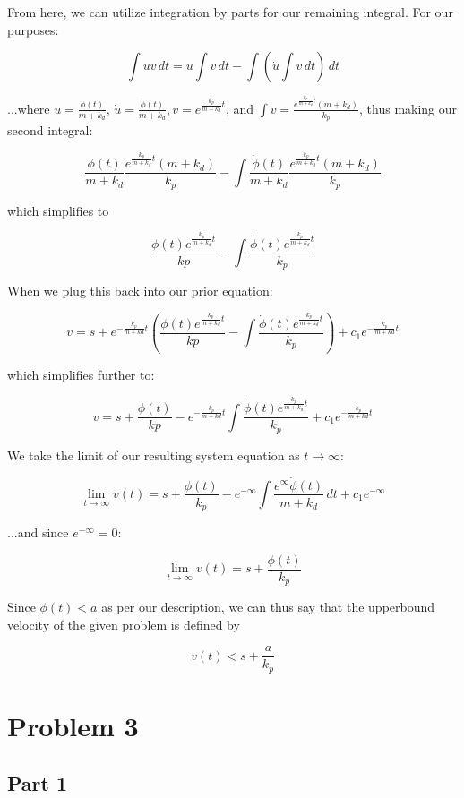 \documentclass{article}
\begin{document}
From here, we can utilize integration by parts for our remaining integral. For our purposes:

\[\int u v \,dt = u \int v \,dt - \int (\dot u \int v \,dt)\,dt\]

...where \(u = \frac{\phi(t)}{m+k_d}\), \(\dot u = \frac{\dot \phi(t)}{m+k_d}, v = e^{\frac{k_p}{m+k_d}t}\), and \(\int v = \frac{e^{\frac{k_p}{m+k_d}t}(m+k_d)}{k_p}\), thus making our second integral:

\[\frac{\phi(t)}{m+k_d} \frac{e^{\frac{k_p}{m+k_d}t}(m+k_d)}{k_p} - \int { \frac{\dot \phi(t)}{m+k_d} \frac{e^{\frac{k_p}{m+k_d}t}(m+k_d)}{k_p}}\]

which simplifies to

\[ \frac{\phi(t) e^{\frac{k_p}{m+k_d}t}}{kp} - \int \frac{\dot \phi(t) e^{\frac{k_p}{m+k_d}t}}{k_p} \]

When we plug this back into our prior equation:

\[v = s + e^{-\frac{k_p}{m+kd}t} (\frac{\phi(t) e^{\frac{k_p}{m+k_d}t}}{kp} - \int \frac{\dot \phi(t) e^{\frac{k_p}{m+k_d}t}}{k_p}) + c_1 e^{-\frac{k_p}{m+kd}t}\]

which simplifies further to:

\[v = s + \frac{\phi(t)}{kp} - e^{-\frac{k_p}{m+kd}t} \int \frac{\dot \phi(t) e^{\frac{k_p}{m+k_d}t}}{k_p} + c_1 e^{-\frac{k_p}{m+kd}t}\]


We take the limit of our resulting system equation as \(t \to \infty\):

\[\lim_{t \to \infty} v(t) = s + \frac{\phi(t)}{k_p} - e^{-\infty} \int \frac{e^{\infty} \dot \phi(t)}{m+k_d} \,dt + c_1 e^{-\infty}\]

...and since \(e^{-\infty} = 0\):

\[\lim_{t \to \infty} v(t) = s + \frac{\phi(t)}{k_p}\]

Since \(\phi(t) < a\) as per our description, we can thus say that the upperbound velocity of the given problem is defined by

\[v(t) < s + \frac{a}{k_p}\]

\section*{Problem 3}

\subsection*{Part 1}
\end{document}
